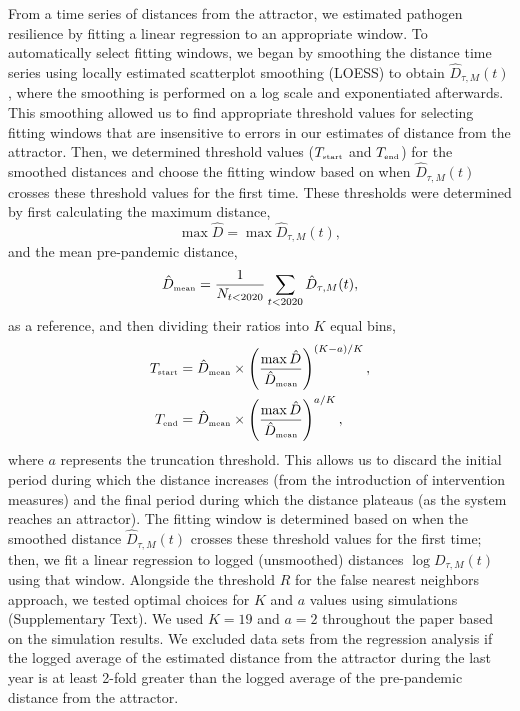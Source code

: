 \documentclass[12pt]{article}
\newcommand{\tsub}[2]{#1_{{\textrm{\tiny #2}}}}
\begin{document}
From a time series of distances from the attractor, we estimated pathogen resilience by fitting a linear regression to an appropriate window.
To automatically select fitting windows, we began by smoothing the distance time series using locally estimated scatterplot smoothing (LOESS) to obtain $\hat{D}_{\tau,M}(t)$, where the smoothing is performed on a log scale and exponentiated afterwards.
This smoothing allowed us to find appropriate threshold values for selecting fitting windows that are insensitive to errors in our estimates of distance from the attractor.
Then, we determined threshold values ($\tsub{T}{start}$ and $\tsub{T}{end}$) for the smoothed distances and choose the fitting window based on when $\hat{D}_{\tau,M}(t)$ crosses these threshold values for the first time.
These thresholds were determined by first calculating the maximum distance,
\begin{equation}
\max \hat{D} = \max \hat{D}_{\tau,M}(t),
\end{equation}
and the mean pre-pandemic distance,
\begin{equation}
\tsub{\hat{D}}{mean} = \frac{1}{N_{t<2020}} \sum_{t < 2020} \hat{D}_{\tau,M}(t),
\end{equation}
as a reference, and then dividing their ratios into $K$ equal bins,
\begin{align}
\tsub{T}{start} &= \tsub{\hat{D}}{mean} \times \left(\frac{\max \hat{D}}{\tsub{\hat{D}}{mean}} \right)^{(K-a)/K},\\
\tsub{T}{end} &= \tsub{\hat{D}}{mean} \times \left(\frac{\max \hat{D}}{\tsub{\hat{D}}{mean}} \right)^{a/K},
\end{align}
where $a$ represents the truncation threshold.
This allows us to discard the initial period during which the distance increases (from the introduction of intervention measures) and the final period during which the distance plateaus (as the system reaches an attractor).
The fitting window is determined based on when the smoothed distance $\hat{D}_{\tau,M}(t)$ crosses these threshold values for the first time; then, we fit a linear regression to logged (unsmoothed) distances $\log D_{\tau,M}(t)$ using that window.
Alongside the threshold $R$ for the false nearest neighbors approach, we tested optimal choices for $K$ and $a$ values using simulations (Supplementary Text).
We used $K=19$ and $a=2$ throughout the paper based on the simulation results.
We excluded data sets from the regression analysis if the logged average of the estimated distance from the attractor during the last year is at least 2-fold greater than the logged average of the pre-pandemic distance from the attractor.
\end{document}
